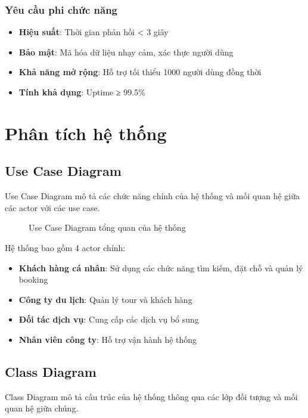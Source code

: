\documentclass[12pt,a4paper]{article}
\begin{document}
\subsubsection{Yêu cầu phi chức năng}
\begin{itemize}
    \item \textbf{Hiệu suất}: Thời gian phản hồi < 3 giây
    \item \textbf{Bảo mật}: Mã hóa dữ liệu nhạy cảm, xác thực người dùng
    \item \textbf{Khả năng mở rộng}: Hỗ trợ tối thiểu 1000 người dùng đồng thời
    \item \textbf{Tính khả dụng}: Uptime ≥ 99.5\%
\end{itemize}

\newpage
\section{Phân tích hệ thống}

\subsection{Use Case Diagram}

Use Case Diagram mô tả các chức năng chính của hệ thống và mối quan hệ giữa các actor với các use case.

\begin{figure}[H]
    \centering
    
    \caption{Use Case Diagram tổng quan của hệ thống}
    \label{fig:usecase_main}
\end{figure}

Hệ thống bao gồm 4 actor chính:
\begin{itemize}
    \item \textbf{Khách hàng cá nhân}: Sử dụng các chức năng tìm kiếm, đặt chỗ và quản lý booking
    \item \textbf{Công ty du lịch}: Quản lý tour và khách hàng
    \item \textbf{Đối tác dịch vụ}: Cung cấp các dịch vụ bổ sung
    \item \textbf{Nhân viên công ty}: Hỗ trợ vận hành hệ thống
\end{itemize}

\subsection{Class Diagram}

Class Diagram mô tả cấu trúc của hệ thống thông qua các lớp đối tượng và mối quan hệ giữa chúng.
\end{document}
